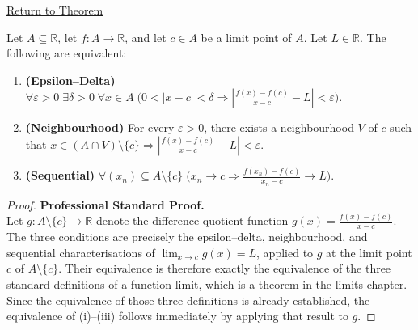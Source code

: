 \newpage
{}
\label{prf:derivative-equivalence}

\begin{remark*}[Return]
\hyperref[thm:derivative-equivalence]{Return to Theorem}
\end{remark*}

\begin{theorem*}
Let $A \subseteq \mathbb{R}$, let $f : A \to \mathbb{R}$, and let $c \in A$ be a limit point of $A$. Let $L \in \mathbb{R}$. The following are equivalent:
\begin{enumerate}[label=(\roman*)]
\item \textbf{(Epsilon--Delta)} $\forall \varepsilon > 0\;\exists \delta > 0\;\forall x \in A\;\bigl(0 < |x-c| < \delta \Rightarrow \left|\tfrac{f(x)-f(c)}{x-c} - L\right| < \varepsilon\bigr)$.
\item \textbf{(Neighbourhood)} For every $\varepsilon > 0$, there exists a neighbourhood $V$ of $c$ such that $x \in (A \cap V) \setminus \{c\} \Rightarrow \left|\tfrac{f(x)-f(c)}{x-c} - L\right| < \varepsilon$.
\item \textbf{(Sequential)} $\forall (x_n) \subseteq A \setminus \{c\}\;\bigl(x_n \to c \Rightarrow \tfrac{f(x_n)-f(c)}{x_n-c} \to L\bigr)$.
\end{enumerate}
\end{theorem*}

\begin{proof}
\textbf{Professional Standard Proof.}~\\
Let $g : A \setminus \{c\} \to \mathbb{R}$ denote the difference quotient function $g(x) = \tfrac{f(x)-f(c)}{x-c}$. The three conditions are precisely the epsilon--delta, neighbourhood, and sequential characterisations of $\lim_{x \to c} g(x) = L$, applied to $g$ at the limit point $c$ of $A \setminus \{c\}$. Their equivalence is therefore exactly the equivalence of the three standard definitions of a function limit, which is a theorem in the limits chapter. Since the equivalence of those three definitions is already established, the equivalence of (i)--(iii) follows immediately by applying that result to $g$.
\end{proof}


